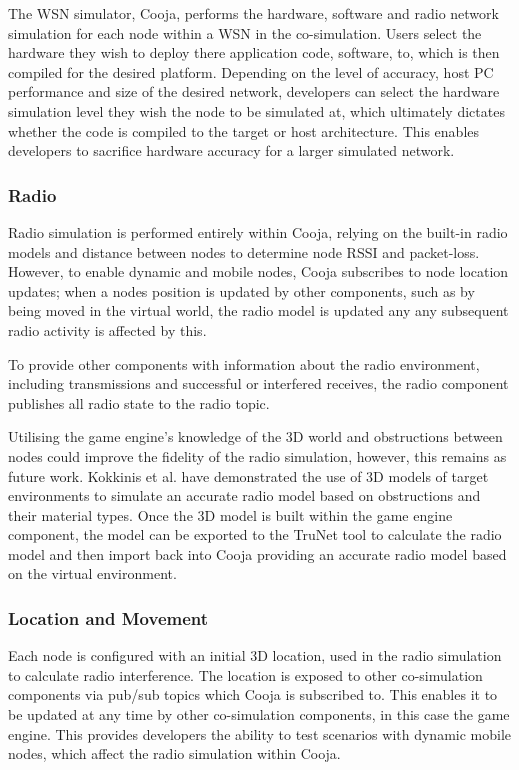 The WSN simulator, Cooja, performs the hardware, software and radio network simulation for each node within a WSN in the co-simulation. 
Users select the hardware they wish to deploy there application code, software, to, which is then compiled for the desired platform. Depending on the level of accuracy, host PC performance and size of the desired network, developers can select the hardware simulation level they wish the node to be simulated at, which ultimately dictates whether the code is compiled to the target or host architecture. This enables developers to sacrifice hardware accuracy for a larger simulated network.

\subsubsection{Radio} %
\label{ssub:radio}

Radio simulation is performed entirely within Cooja, relying on the built-in radio models and distance between nodes to determine node RSSI and packet-loss. However, to enable dynamic and mobile nodes, Cooja subscribes to node location updates; when a nodes position is updated by other components, such as by being moved in the virtual world, the radio model is updated any any subsequent radio activity is affected by this.

To provide other components with information about the radio environment, including transmissions and successful or interfered receives, the radio component publishes all radio state to the radio topic. 

Utilising the game engine's knowledge of the 3D world and obstructions between nodes could improve the fidelity of the radio simulation, however, this remains as future work. Kokkinis et al.\cite{trunetWireless} have demonstrated the use of 3D models of target environments to simulate an accurate radio model based on obstructions and their material types. Once the 3D model is built within the game engine component, the model can be exported to the TruNet tool to calculate the radio model and then import back into Cooja providing an accurate radio model based on the virtual environment.


\subsubsection{Location and Movement} %
\label{ssub:location}

Each node is configured with an initial 3D location, used in the radio simulation to calculate radio interference. The location is exposed to other co-simulation components via pub/sub topics which Cooja is subscribed to. This enables it to be updated at any time by other co-simulation components, in this case the game engine. This provides developers the ability to test scenarios with dynamic mobile nodes, which affect the radio simulation within Cooja.

